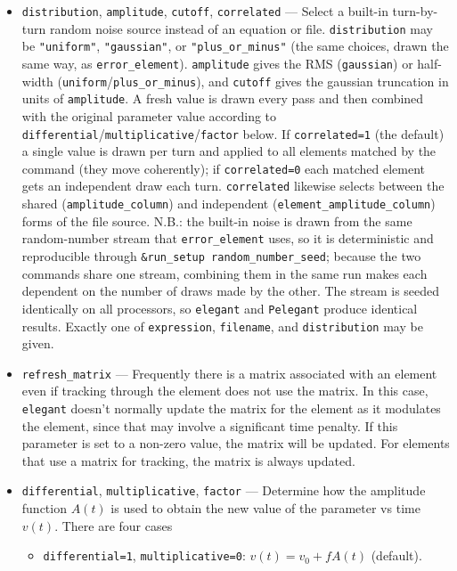\documentclass[11pt]{article}
\begin{document}
\begin{itemize}
  columns share the single \verb|time_column|.  Give exactly one of \verb|amplitude_column| and
  \verb|element_amplitude_column|.
\item \verb|distribution|, \verb|amplitude|, \verb|cutoff|, \verb|correlated| --- Select a built-in
  turn-by-turn random noise source instead of an equation or file.  \verb|distribution| may be
  \verb|"uniform"|, \verb|"gaussian"|, or \verb|"plus_or_minus"| (the same choices, drawn the same
  way, as \verb|error_element|).  \verb|amplitude| gives the RMS (\verb|gaussian|) or half-width
  (\verb|uniform|/\verb|plus_or_minus|), and \verb|cutoff| gives the gaussian truncation in units of
  \verb|amplitude|.  A fresh value is drawn every pass and then combined with the original parameter
  value according to \verb|differential|/\verb|multiplicative|/\verb|factor| below.  If
  \verb|correlated=1| (the default) a single value is drawn per turn and applied to all elements
  matched by the command (they move coherently); if \verb|correlated=0| each matched element gets an
  independent draw each turn.  \verb|correlated| likewise selects between the shared
  (\verb|amplitude_column|) and independent (\verb|element_amplitude_column|) forms of the file source.
  N.B.: the built-in noise is drawn from the same random-number stream that \verb|error_element| uses,
  so it is deterministic and reproducible through \verb|&run_setup random_number_seed|; because the
  two commands share one stream, combining them in the same run makes each dependent on the number of
  draws made by the other.  The stream is seeded identically on all processors, so \verb|elegant| and
  \verb|Pelegant| produce identical results.  Exactly one of \verb|expression|, \verb|filename|, and
  \verb|distribution| may be given.
\item \verb|refresh_matrix| --- Frequently there is a matrix associated with an element even
  if tracking through the element does not use the matrix.  In this case, {\tt elegant} doesn't
  normally update the matrix for the element as it modulates the element, since that may involve
  a significant time penalty.  If this parameter is set to a non-zero value, the matrix will
  be updated.  For elements that use a matrix for tracking, the matrix is always updated.
\item \verb|differential|, \verb|multiplicative|, \verb|factor| --- Determine how the amplitude function
  $A(t)$ is used to obtain the new value of the parameter vs time $v(t)$.  There are four cases
  \begin{itemize}
    \item \verb|differential=1|, \verb|multiplicative=0|: $v(t) = v_0 + f A(t)$ (default).

\end{itemize}
\end{itemize}
\end{document}
